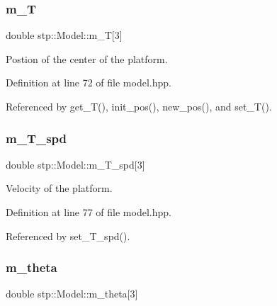 \mbox{\label{classstp_1_1_model_a61d8b4957be741fa473468065c2a5d0d}} 
\subsubsection{\texorpdfstring{m\+\_\+T}{m\_T}}
{\footnotesize\ttfamily double stp\+::\+Model\+::m\+\_\+T\mbox{[}3\mbox{]}\hspace{0.3cm}{\ttfamily [protected]}}

Postion of the center of the platform. 

Definition at line 72 of file model.\+hpp.



Referenced by get\+\_\+\+T(), init\+\_\+pos(), new\+\_\+pos(), and set\+\_\+\+T().

\mbox{\label{classstp_1_1_model_a0ba1c1143089052ffad8133ff40d972f}} 
\subsubsection{\texorpdfstring{m\+\_\+\+T\+\_\+spd}{m\_T\_spd}}
{\footnotesize\ttfamily double stp\+::\+Model\+::m\+\_\+\+T\+\_\+spd\mbox{[}3\mbox{]}\hspace{0.3cm}{\ttfamily [protected]}}

Velocity of the platform. 

Definition at line 77 of file model.\+hpp.



Referenced by set\+\_\+\+T\+\_\+spd().

\mbox{\label{classstp_1_1_model_a826586afc60c2c076b271413f5c3e382}} 
\subsubsection{\texorpdfstring{m\+\_\+theta}{m\_theta}}
{\footnotesize\ttfamily double stp\+::\+Model\+::m\+\_\+theta\mbox{[}3\mbox{]}\hspace{0.3cm}{\ttfamily [protected]}}

